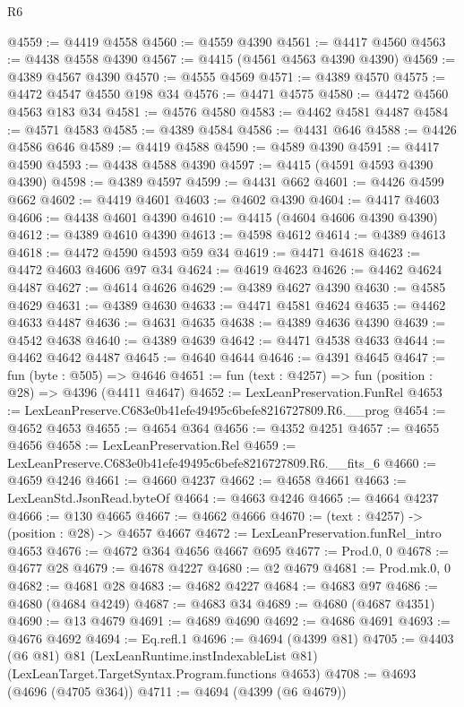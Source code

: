 \begin{lexlean}{R6}
\begin{coremodule}
@4559 := @4419 @4558
@4560 := @4559 @4390
@4561 := @4417 @4560
@4563 := @4438 @4558 @4390
@4567 := @4415 (@4561 @4563 @4390 @4390)
@4569 := @4389 @4567 @4390
@4570 := @4555 @4569
@4571 := @4389 @4570
@4575 := @4472 @4547 @4550 @198 @34
@4576 := @4471 @4575
@4580 := @4472 @4560 @4563 @183 @34
@4581 := @4576 @4580
@4583 := @4462 @4581 @4487
@4584 := @4571 @4583
@4585 := @4389 @4584
@4586 := @4431 @646
@4588 := @4426 @4586 @646
@4589 := @4419 @4588
@4590 := @4589 @4390
@4591 := @4417 @4590
@4593 := @4438 @4588 @4390
@4597 := @4415 (@4591 @4593 @4390 @4390)
@4598 := @4389 @4597
@4599 := @4431 @662
@4601 := @4426 @4599 @662
@4602 := @4419 @4601
@4603 := @4602 @4390
@4604 := @4417 @4603
@4606 := @4438 @4601 @4390
@4610 := @4415 (@4604 @4606 @4390 @4390)
@4612 := @4389 @4610 @4390
@4613 := @4598 @4612
@4614 := @4389 @4613
@4618 := @4472 @4590 @4593 @59 @34
@4619 := @4471 @4618
@4623 := @4472 @4603 @4606 @97 @34
@4624 := @4619 @4623
@4626 := @4462 @4624 @4487
@4627 := @4614 @4626
@4629 := @4389 @4627 @4390
@4630 := @4585 @4629
@4631 := @4389 @4630
@4633 := @4471 @4581 @4624
@4635 := @4462 @4633 @4487
@4636 := @4631 @4635
@4638 := @4389 @4636 @4390
@4639 := @4542 @4638
@4640 := @4389 @4639
@4642 := @4471 @4538 @4633
@4644 := @4462 @4642 @4487
@4645 := @4640 @4644
@4646 := @4391 @4645
@4647 := fun (byte : @505) => @4646
@4651 := fun (text : @4257) => fun (position : @28) => @4396 (@4411 @4647)
@4652 := LexLeanPreservation.FunRel
@4653 := LexLeanPreserve.C683e0b41efe49495c6befe8216727809.R6.__prog
@4654 := @4652 @4653
@4655 := @4654 @364
@4656 := @4352 @4251
@4657 := @4655 @4656
@4658 := LexLeanPreservation.Rel
@4659 := LexLeanPreserve.C683e0b41efe49495c6befe8216727809.R6.__fits_6
@4660 := @4659 @4246
@4661 := @4660 @4237
@4662 := @4658 @4661
@4663 := LexLeanStd.JsonRead.byteOf
@4664 := @4663 @4246
@4665 := @4664 @4237
@4666 := @130 @4665
@4667 := @4662 @4666
@4670 := (text : @4257) -> (position : @28) -> @4657 @4667
@4672 := LexLeanPreservation.funRel_intro @4653
@4676 := @4672 @364 @4656 @4667 @695
@4677 := Prod.{0, 0}
@4678 := @4677 @28
@4679 := @4678 @4227
@4680 := @2 @4679
@4681 := Prod.mk.{0, 0}
@4682 := @4681 @28
@4683 := @4682 @4227
@4684 := @4683 @97
@4686 := @4680 (@4684 @4249)
@4687 := @4683 @34
@4689 := @4680 (@4687 @4351)
@4690 := @13 @4679
@4691 := @4689 @4690
@4692 := @4686 @4691
@4693 := @4676 @4692
@4694 := Eq.refl.{1}
@4696 := @4694 (@4399 @81)
@4705 := @4403
    (@6 @81)
    @81
    (LexLeanRuntime.instIndexableList @81)
    (LexLeanTarget.TargetSyntax.Program.functions @4653)
@4708 := @4693 (@4696 (@4705 @364))
@4711 := @4694 (@4399 (@6 @4679))

\end{coremodule}
\end{lexlean}
